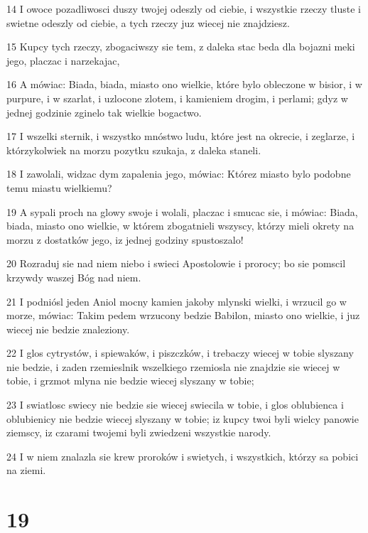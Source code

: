 \par 14 I owoce pozadliwosci duszy twojej odeszly od ciebie, i wszystkie rzeczy tluste i swietne odeszly od ciebie, a tych rzeczy juz wiecej nie znajdziesz.
\par 15 Kupcy tych rzeczy, zbogaciwszy sie tem, z daleka stac beda dla bojazni meki jego, placzac i narzekajac,
\par 16 A mówiac: Biada, biada, miasto ono wielkie, które bylo obleczone w bisior, i w purpure, i w szarlat, i uzlocone zlotem, i kamieniem drogim, i perlami; gdyz w jednej godzinie zginelo tak wielkie bogactwo.
\par 17 I wszelki sternik, i wszystko mnóstwo ludu, które jest na okrecie, i zeglarze, i którzykolwiek na morzu pozytku szukaja, z daleka staneli.
\par 18 I zawolali, widzac dym zapalenia jego, mówiac: Którez miasto bylo podobne temu miastu wielkiemu?
\par 19 A sypali proch na glowy swoje i wolali, placzac i smucac sie, i mówiac: Biada, biada, miasto ono wielkie, w którem zbogatnieli wszyscy, którzy mieli okrety na morzu z dostatków jego, iz jednej godziny spustoszalo!
\par 20 Rozraduj sie nad niem niebo i swieci Apostolowie i prorocy; bo sie pomscil krzywdy waszej Bóg nad niem.
\par 21 I podniósl jeden Aniol mocny kamien jakoby mlynski wielki, i wrzucil go w morze, mówiac: Takim pedem wrzucony bedzie Babilon, miasto ono wielkie, i juz wiecej nie bedzie znaleziony.
\par 22 I glos cytrystów, i spiewaków, i piszczków, i trebaczy wiecej w tobie slyszany nie bedzie, i zaden rzemieslnik wszelkiego rzemiosla nie znajdzie sie wiecej w tobie, i grzmot mlyna nie bedzie wiecej slyszany w tobie;
\par 23 I swiatlosc swiecy nie bedzie sie wiecej swiecila w tobie, i glos oblubienca i oblubienicy nie bedzie wiecej slyszany w tobie; iz kupcy twoi byli wielcy panowie ziemscy, iz czarami twojemi byli zwiedzeni wszystkie narody.
\par 24 I w niem znalazla sie krew proroków i swietych, i wszystkich, którzy sa pobici na ziemi.

\chapter{19}

